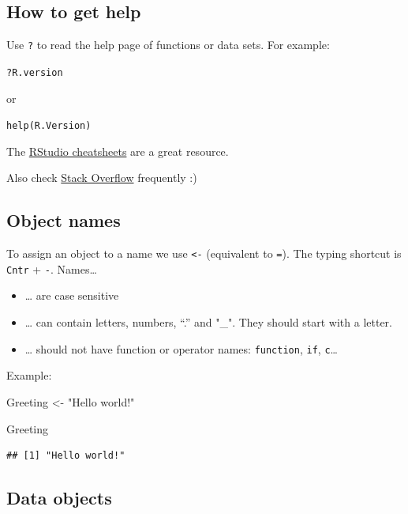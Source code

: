 \documentclass[
]{article}
\newenvironment{Shaded}{\begin{snugshade}}{\end{snugshade}}
\newcommand{\NormalTok}[1]{#1}
\newcommand{\StringTok}[1]{\textcolor[rgb]{0.31,0.60,0.02}{#1}}
\providecommand{\tightlist}{%
  \setlength{\itemsep}{0pt}\setlength{\parskip}{0pt}}
\begin{document}
\hypertarget{how-to-get-help}{%
\subsection{How to get help}\label{how-to-get-help}}

Use \texttt{?} to read the help page of functions or data sets. For
example:

\texttt{?R.version}

or

\texttt{help(R.Version)}

The \href{https://www.rstudio.com/resources/cheatsheets/}{RStudio
cheatsheets} are a great resource.

Also check \href{https://stackoverflow.com/questions/tagged/r}{Stack
Overflow} frequently :)

\hypertarget{object-names}{%
\subsection{Object names}\label{object-names}}

To assign an object to a name we use \texttt{\textless{}-} (equivalent
to \texttt{=}). The typing shortcut is \texttt{Cntr} + \texttt{-}.
Names\ldots{}

\begin{itemize}
\tightlist
\item
  \ldots{} are case sensitive
\item
  \ldots{} can contain letters, numbers, ``.'' and "\_". They should
  start with a letter.
\item
  \ldots{} should not have function or operator names:
  \texttt{function}, \texttt{if}, \texttt{c}\ldots{}
\end{itemize}

Example:

\begin{Shaded}
\begin{Highlighting}[]
\NormalTok{Greeting <-}\StringTok{ "Hello world!"}

\NormalTok{Greeting}
\end{Highlighting}
\end{Shaded}

\begin{verbatim}
## [1] "Hello world!"
\end{verbatim}

\hypertarget{data-objects}{%
\subsection{Data objects}\label{data-objects}}
\end{document}
